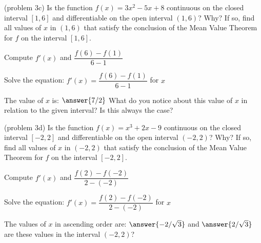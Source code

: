 \documentclass[handout]{ximera}
\begin{document}
\begin{problem}(problem 3c)
  Is the function $f(x) = 3x^2 -5x + 8$ continuous on the closed interval $[1,6]$ and differentiable on the open interval $(1,6)$? Why?
  If so, find all values of $x$ in $(1,6)$ that satisfy the conclusion of the Mean Value Theorem for $f$ on the interval $[1,6]$.
	
    \begin{hint}
      Compute $f'(x)$ and $\dfrac{f(6) - f(1)}{6-1}$
    \end{hint}
		\begin{hint}
		  Solve the equation: $f'(x) = \dfrac{f(6) - f(1)}{6-1}$ for $x$
		\end{hint}
		
		The value of $x$ is:
		 $\answer{7/2}$
     What do you notice about this value of $x$ in relation to the given interval? Is this always the case?
\end{problem}

\begin{problem}(problem 3d)
  Is the function $f(x) = x^3 + 2x -9$ continuous on the closed interval $[-2,2]$ and differentiable on the open interval $(-2,2)$? Why?
  If so, find all values of $x$ in $(-2,2)$ that satisfy the conclusion of the Mean Value Theorem for $f$ on the interval $[-2,2]$.
  	
    \begin{hint}
      Compute $f'(x)$ and $\dfrac{f(2) - f(-2)}{2-(-2)}$
    \end{hint}
		\begin{hint}
		  Solve the equation: $f'(x) = \dfrac{f(2) - f(-2)}{2-(-2)}$ for $x$
		\end{hint}
		
		The values of $x$ in ascending order are:
		 $\answer{-2/\sqrt 3}$ and $\answer{2/\sqrt 3}$
     are these values in the interval $(-2,2)$?
\end{problem}
\end{document}
